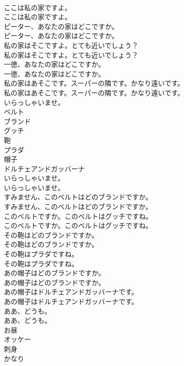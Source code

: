 \documentclass[8pt]{extreport}
\begin{document}
\begin{CJK}{UTF8}{min}
\\	ここは私の家ですよ。	
\\	ここは私の家ですよ。 
\\	ピーター、あなたの家はどこですか。	
\\	ピーター、あなたの家はどこですか。 
\\	私の家はそこですよ。とても近いでしょう？	
\\	私の家はそこですよ。とても近いでしょう？ 
\\	一徳、あなたの家はどこですか。	
\\	一徳、あなたの家はどこですか。 
\\	私の家はあそこです。スーパーの隣です。かなり遠いです。	
\\	私の家はあそこです。スーパーの隣です。かなり遠いです。 
\\	いらっしゃいませ。
\\	ベルト
\\	ブランド
\\	グッチ
\\	鞄
\\	プラダ
\\	帽子
\\	ドルチェアンドガッバーナ
\\	いらっしゃいませ。	
\\	いらっしゃいませ。 
\\	すみません、このベルトはどのブランドですか。	
\\	すみません、このベルトはどのブランドですか。 
\\	このベルトですか。このベルトはグッチですね。	
\\	このベルトですか。このベルトはグッチですね。 
\\	その鞄はどのブランドですか。	
\\	その鞄はどのブランドですか。 
\\	その鞄はプラダですね。	
\\	その鞄はプラダですね。 
\\	あの帽子はどのブランドですか。	
\\	あの帽子はどのブランドですか。 
\\	あの帽子はドルチェアンドガッバーナです。	
\\	あの帽子はドルチェアンドガッバーナです。 
\\	ああ、どうも。	
\\	ああ、どうも。 
\\	お昼
\\	オッケー
\\	刺身
\\	かなり

\end{CJK}
\end{document}
